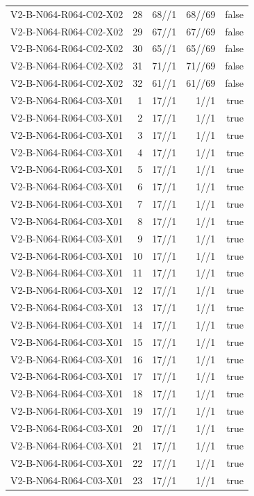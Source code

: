 {\begin{longtable}{lrrrr}
V2-B-N064-R064-C02-X02 & 28 & 68//1 & 68//69 & false \\
V2-B-N064-R064-C02-X02 & 29 & 67//1 & 67//69 & false \\
V2-B-N064-R064-C02-X02 & 30 & 65//1 & 65//69 & false \\
V2-B-N064-R064-C02-X02 & 31 & 71//1 & 71//69 & false \\
V2-B-N064-R064-C02-X02 & 32 & 61//1 & 61//69 & false \\
V2-B-N064-R064-C03-X01 & 1 & 17//1 & 1//1 & true \\
V2-B-N064-R064-C03-X01 & 2 & 17//1 & 1//1 & true \\
V2-B-N064-R064-C03-X01 & 3 & 17//1 & 1//1 & true \\
V2-B-N064-R064-C03-X01 & 4 & 17//1 & 1//1 & true \\
V2-B-N064-R064-C03-X01 & 5 & 17//1 & 1//1 & true \\
V2-B-N064-R064-C03-X01 & 6 & 17//1 & 1//1 & true \\
V2-B-N064-R064-C03-X01 & 7 & 17//1 & 1//1 & true \\
V2-B-N064-R064-C03-X01 & 8 & 17//1 & 1//1 & true \\
V2-B-N064-R064-C03-X01 & 9 & 17//1 & 1//1 & true \\
V2-B-N064-R064-C03-X01 & 10 & 17//1 & 1//1 & true \\
V2-B-N064-R064-C03-X01 & 11 & 17//1 & 1//1 & true \\
V2-B-N064-R064-C03-X01 & 12 & 17//1 & 1//1 & true \\
V2-B-N064-R064-C03-X01 & 13 & 17//1 & 1//1 & true \\
V2-B-N064-R064-C03-X01 & 14 & 17//1 & 1//1 & true \\
V2-B-N064-R064-C03-X01 & 15 & 17//1 & 1//1 & true \\
V2-B-N064-R064-C03-X01 & 16 & 17//1 & 1//1 & true \\
V2-B-N064-R064-C03-X01 & 17 & 17//1 & 1//1 & true \\
V2-B-N064-R064-C03-X01 & 18 & 17//1 & 1//1 & true \\
V2-B-N064-R064-C03-X01 & 19 & 17//1 & 1//1 & true \\
V2-B-N064-R064-C03-X01 & 20 & 17//1 & 1//1 & true \\
V2-B-N064-R064-C03-X01 & 21 & 17//1 & 1//1 & true \\
V2-B-N064-R064-C03-X01 & 22 & 17//1 & 1//1 & true \\
V2-B-N064-R064-C03-X01 & 23 & 17//1 & 1//1 & true \\

\end{longtable}}
